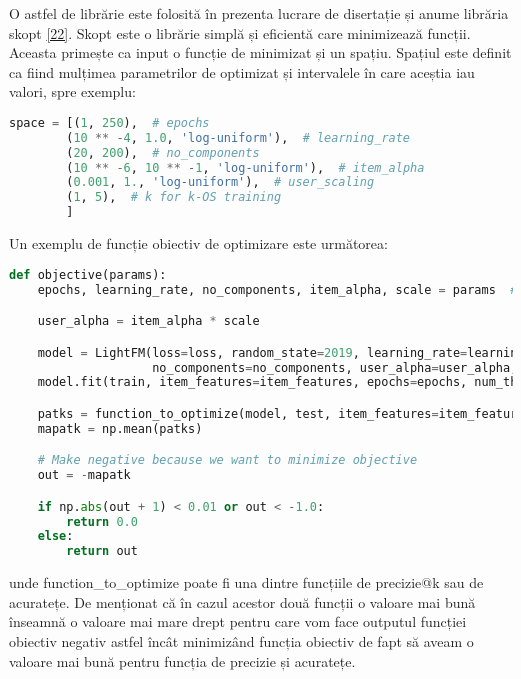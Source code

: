 O astfel de librărie este folosită în prezenta lucrare de disertație și anume librăria skopt \hyperlink{skopt}{[22]}. Skopt este o librărie simplă și eficientă care minimizează funcții. Aceasta primește ca input o funcție de minimizat și un spațiu. Spațiul este definit ca fiind mulțimea parametrilor de optimizat și intervalele în care aceștia iau valori, spre exemplu:
\begin{lstlisting}[language=Python, caption=Spațiul parametrilor de optimizat]
space = [(1, 250),  # epochs
        (10 ** -4, 1.0, 'log-uniform'),  # learning_rate
        (20, 200),  # no_components
        (10 ** -6, 10 ** -1, 'log-uniform'),  # item_alpha
        (0.001, 1., 'log-uniform'),  # user_scaling
        (1, 5),  # k for k-OS training
        ] 
\end{lstlisting}

Un exemplu de funcție obiectiv de optimizare este următorea:
\begin{lstlisting}[language=Python, caption=Funcția obiectiv]
def objective(params):
    epochs, learning_rate, no_components, item_alpha, scale = params  # 'k_os'

    user_alpha = item_alpha * scale

    model = LightFM(loss=loss, random_state=2019, learning_rate=learning_rate,
                    no_components=no_components, user_alpha=user_alpha, item_alpha=item_alpha)
    model.fit(train, item_features=item_features, epochs=epochs, num_threads=threads, verbose=True)

    patks = function_to_optimize(model, test, item_features=item_features, num_threads=threads)
    mapatk = np.mean(patks)

    # Make negative because we want to minimize objective
    out = -mapatk

    if np.abs(out + 1) < 0.01 or out < -1.0:
        return 0.0
    else:
        return out
\end{lstlisting}
unde function\_to\_optimize poate fi una dintre funcțiile de precizie@k sau de acuratețe. De menționat că în cazul acestor două funcții o valoare mai bună înseamnă o valoare mai mare drept pentru care vom face outputul funcției obiectiv negativ astfel încât minimizând funcția obiectiv de fapt să aveam o valoare mai bună pentru funcția de precizie și acuratețe.

